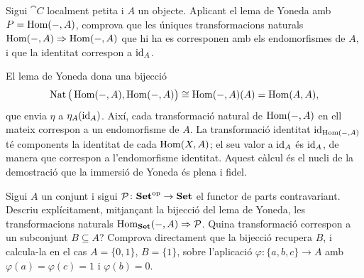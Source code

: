 \begin{exercici}
Sigui $\cat{C}$ localment petita i $A$ un objecte. Aplicant el lema de Yoneda amb $P=\operatorname{Hom}(-,A)$, comprova que les úniques transformacions naturals $\operatorname{Hom}(-,A)\Rightarrow\operatorname{Hom}(-,A)$ que hi ha es corresponen amb els endomorfismes de $A$, i que la identitat correspon a $\operatorname{id}_A$.
\end{exercici}

\begin{solucio}
El lema de Yoneda dona una bijecció
\[
\operatorname{Nat}\big(\operatorname{Hom}(-,A),\operatorname{Hom}(-,A)\big)\cong\operatorname{Hom}(-,A)(A)=\operatorname{Hom}(A,A),
\]
que envia $\eta$ a $\eta_A(\operatorname{id}_A)$. Així, cada transformació natural de $\operatorname{Hom}(-,A)$ en ell mateix correspon a un endomorfisme de $A$. La transformació identitat $\operatorname{id}_{\operatorname{Hom}(-,A)}$ té components la identitat de cada $\operatorname{Hom}(X,A)$; el seu valor a $\operatorname{id}_A$ és $\operatorname{id}_A$, de manera que correspon a l'endomorfisme identitat. Aquest càlcul és el nucli de la demostració que la immersió de Yoneda és plena i fidel.
\end{solucio}

\begin{exercici}\label{pr-yoneda-parts}
Sigui $A$ un conjunt i sigui $\mathcal P\colon\mathbf{Set}^{\mathrm{op}}\to\mathbf{Set}$ el functor de parts contravariant. Descriu explícitament, mitjançant la bijecció del lema de Yoneda, les transformacions naturals $\operatorname{Hom}_{\mathbf{Set}}(-,A)\Rightarrow\mathcal P$. Quina transformació correspon a un subconjunt $B\subseteq A$? Comprova directament que la bijecció recupera $B$, i calcula-la en el cas $A=\{0,1\}$, $B=\{1\}$, sobre l'aplicació $\varphi\colon\{a,b,c\}\to A$ amb $\varphi(a)=\varphi(c)=1$ i $\varphi(b)=0$.
\end{exercici}

